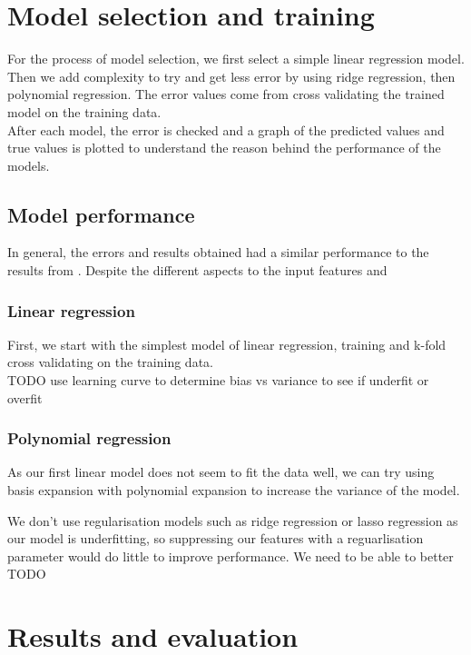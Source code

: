 \documentclass{article}
\newcommand{\n}[0]{\\[\baselineskip]}
\begin{document}
\section{Model selection and training}
For the process of model selection, we first select a simple linear regression model. Then we add complexity to try and get less error by using ridge regression, then polynomial regression. The error values come from cross validating the trained model on the training data.
\n
After each model, the error is checked and a graph of the predicted values and true values is plotted to understand the reason behind the performance of the models.

\subsection{Model performance}
In general, the errors and results obtained had a similar performance to the results from \cite{paper}. Despite the different aspects to the input features and

\subsubsection{Linear regression}
First, we start with the simplest model of linear regression, training and k-fold cross validating on the training data. 
\n

TODO use learning curve to determine bias vs variance to see if underfit or overfit

\subsubsection{Polynomial regression}
As our first linear model does not seem to fit the data well, we can try using basis expansion with polynomial expansion to increase the variance of the model. 




We don't use regularisation models such as ridge regression or lasso regression as our model is underfitting, so suppressing our features with a reguarlisation parameter would do little to improve performance. We need to be able to better TODO

\section{Results and evaluation}
\end{document}
